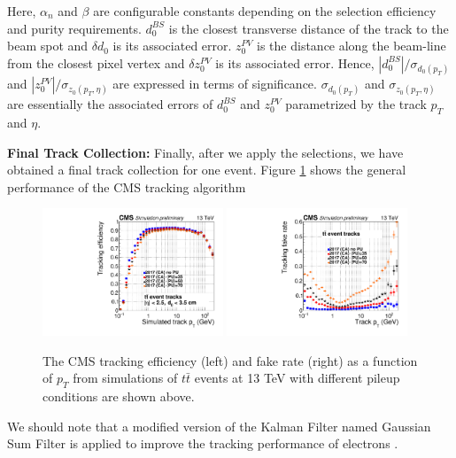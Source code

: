 Here, $\alpha_n$ and $\beta$ are configurable constants depending on the selection efficiency and purity requirements. $d_0^{BS}$ is the closest transverse distance of the track to the beam spot and $\delta d_0$ is its associated error. $z_0^{PV}$ is the distance along the beam-line from the closest pixel vertex and $\delta z_0^{PV}$ is its associated error. Hence, $|d_0^{BS}|/ \sigma_{d_0(p_T)}$ and $|z_0^{PV}|/ \sigma_{z_0(p_T,\eta)}$ are expressed in terms of significance. $\sigma_{d_0(p_T)}$ and $\sigma_{z_0(p_T,\eta)}$ are essentially the associated errors of $d_0^{BS}$ and $z_0^{PV}$ parametrized by the track $p_T$ and $\eta$.


\textbf{Final Track Collection:}  Finally, after we apply the selections, we have obtained a final track collection for one event. Figure \ref{CMSTrackPer} shows the general performance of the CMS tracking algorithm

\begin{figure}[hbtp]
\begin{center}
\includegraphics[width=0.48\textwidth]{Figures/Chapter4/TrackPTEff.pdf}
\includegraphics[width=0.48\textwidth]{Figures/Chapter4/TrackPTFake.pdf}
\caption{The CMS tracking efficiency (left) and fake rate (right) as a function of $p_T$ from simulations of $t \bar t$ events at 13 TeV with different pileup conditions are shown above.}
\label{CMSTrackPer}
\end{center}
\end{figure} 

We should note that a modified version of the Kalman Filter named Gaussian Sum Filter \cite{GSF} is applied to improve the tracking performance of electrons \cite{CMSTrackComp}.



